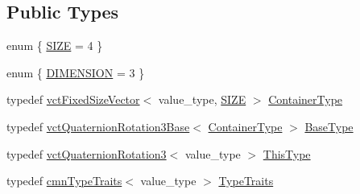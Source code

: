 \subsection*{Public Types}
\begin{DoxyCompactItemize}
\item 
enum \{ \hyperlink{group__cisst_vector_ggaf79c9874c4f1376d8f3fa7b15f140ff3afdd3977ff1d88ceaba530cfcdcc661b7}{S\+I\+Z\+E} = 4
 \}
\item 
enum \{ \hyperlink{group__cisst_vector_ggae952bd5b245e3d6f3740fa115776e90ea0793f2e11223485735287937bd52b876}{D\+I\+M\+E\+N\+S\+I\+O\+N} = 3
 \}
\item 
typedef \hyperlink{classvct_fixed_size_vector}{vct\+Fixed\+Size\+Vector}$<$ value\+\_\+type, \hyperlink{group__cisst_vector_ggaf79c9874c4f1376d8f3fa7b15f140ff3afdd3977ff1d88ceaba530cfcdcc661b7}{S\+I\+Z\+E} $>$ \hyperlink{classvct_quaternion_rotation3_a73c9511393f9a59206e3ca57c3564454}{Container\+Type}
\item 
typedef \hyperlink{classvct_quaternion_rotation3_base}{vct\+Quaternion\+Rotation3\+Base}$<$ \hyperlink{classvct_quaternion_rotation3_a73c9511393f9a59206e3ca57c3564454}{Container\+Type} $>$ \hyperlink{classvct_quaternion_rotation3_aaeef12df3c8d36659b11c3c8df04905f}{Base\+Type}
\item 
typedef \hyperlink{classvct_quaternion_rotation3}{vct\+Quaternion\+Rotation3}$<$ value\+\_\+type $>$ \hyperlink{classvct_quaternion_rotation3_a8150de55a15eb3adfc8f59a8815ddc70}{This\+Type}
\item 
typedef \hyperlink{classcmn_type_traits}{cmn\+Type\+Traits}$<$ value\+\_\+type $>$ \hyperlink{classvct_quaternion_rotation3_aa51626a8a27b17262aaabb133ac868e9}{Type\+Traits}
\end{DoxyCompactItemize}
